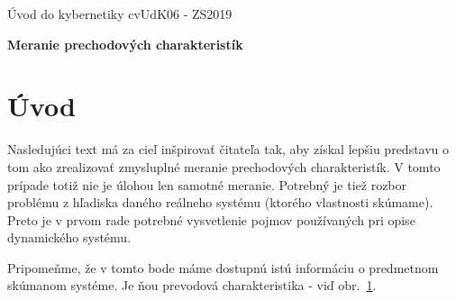 \documentclass[a4paper, 10pt, ]{article}
\def\oznacenieCasti{cvUdK06 - ZS2019}
\begin{document}
\lstset{style=mystyle}


\fontsize{12pt}{22pt}\selectfont

\centerline{\textsf{Úvod do kybernetiky} \hfill \textsf{\oznacenieCasti}}

\fontsize{18pt}{22pt}\selectfont





\begin{flushleft}
    \textbf{\textsf{Meranie prechodových charakteristík}}
\end{flushleft}





\normalsize

\bigskip

\tableofcontents

\bigskip

\vspace{18pt}





\section{Úvod}


Nasledujúci text má za cieľ inšpirovať čitateľa tak, aby získal lepšiu predstavu o tom ako zrealizovať zmysluplné meranie prechodových charakteristík. V tomto prípade totiž nie je úlohou len samotné meranie. Potrebný je tiež rozbor problému z hľadiska daného reálneho systému (ktorého vlastnosti skúmame). Preto je v prvom rade potrebné vysvetlenie pojmov používaných pri opise dynamického systému.


Pripomeňme, že v tomto bode máme dostupnú istú informáciu o predmetnom skúmanom systéme. Je ňou prevodová charakteristika - viď obr.~\ref{Prevodová charakteristika graf}.



\begin{figure}[!b]
	\centering


    \vspace{-4mm}

	\caption{}
	\label{Prevodová charakteristika graf}

\end{figure}
\end{document}
